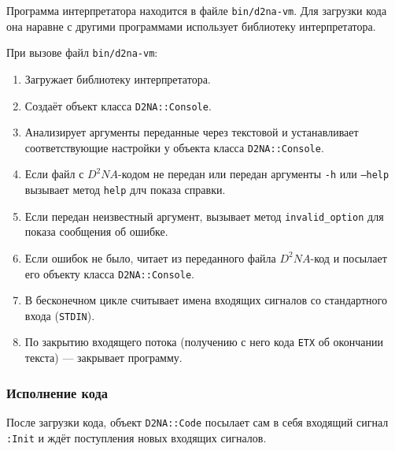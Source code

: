 \documentclass[utf8,a5paper,portrait,10pt,twoside]{eskdtext}
\begin{document}
Программа интерпретатора находится в файле \texttt{bin/d2na-vm}. Для загрузки
кода она наравне с другими программами использует библиотеку интерпретатора.

При вызове файл \texttt{bin/d2na-vm}:
\begin{enumerate}
  \item Загружает библиотеку интерпретатора.
  \item Создаёт объект класса \texttt{D2NA::Console}.
  \item Анализирует аргументы переданные через текстовой и устанавливает
        соответствующие настройки у объекта класса \texttt{D2NA::Console}.
  \item Если файл с $D^2NA$-кодом не передан или передан аргументы \texttt{-h}
        или \texttt{--help} вызывает метод \texttt{help} длч показа справки.
  \item Если передан неизвестный аргумент, вызывает метод
        \texttt{invalid\_option} для показа сообщения об ошибке.
  \item Если ошибок не было, читает из переданного файла $D^2NA$-код и посылает
        его объекту класса \texttt{D2NA::Console}.
  \item В бесконечном цикле считывает имена входящих сигналов со стандартного
        входа (\texttt{STDIN}).
  \item По закрытию входящего потока (получению с него кода \texttt{ETX} об
        окончании текста) — закрывает программу.
\end{enumerate}

\newpage
\subsubsection{Исполнение кода}

После загрузки кода, объект \texttt{D2NA::Code} посылает сам в себя входящий
сигнал \texttt{:Init} и ждёт поступления новых входящих сигналов.
\end{document}
